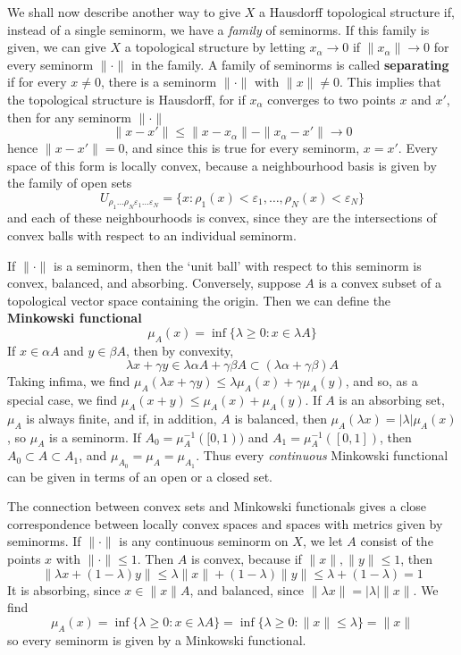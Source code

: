 We shall now describe another way to give $X$ a Hausdorff topological structure if, instead of a single seminorm, we have a {\it family} of seminorms. If this family is given, we can give $X$ a topological structure by letting $x_\alpha \to 0$ if $\| x_\alpha \| \to 0$ for every seminorm $\| \cdot \|$ in the family. A family of seminorms is called {\bf separating} if for every $x \neq 0$, there is a seminorm $\| \cdot \|$ with $\| x \| \neq 0$. This implies that the topological structure is Hausdorff, for if $x_\alpha$ converges to two points $x$ and $x'$, then for any seminorm $\| \cdot \|$
%
\[ \| x - x' \| \leq \| x - x_\alpha \| - \| x_\alpha - x' \| \to 0 \]
%
hence $\| x - x' \| = 0$, and since this is true for every seminorm, $x = x'$. Every space of this form is locally convex, because a neighbourhood basis is given by the family of open sets
%
\[ U_{\rho_1 \dots \rho_N \varepsilon_1 \dots \varepsilon_N} = \{ x: \rho_1(x) < \varepsilon_1, \dots, \rho_N(x) < \varepsilon_N \} \]
%
and each of these neighbourhoods is convex, since they are the intersections of convex balls with respect to an individual seminorm.

If $\| \cdot \|$ is a seminorm, then the `unit ball' with respect to this seminorm is convex, balanced, and absorbing. Conversely, suppose $A$ is a convex subset of a topological vector space containing the origin. Then we can define the {\bf Minkowski functional}
%
\[ \mu_A(x) = \inf \{ \lambda \geq 0: x \in \lambda A \} \]
%
If $x \in \alpha A$ and $y \in \beta A$, then by convexity,
%
\[ \lambda x + \gamma y \in \lambda \alpha A + \gamma \beta A \subset (\lambda \alpha + \gamma \beta) A \]
%
Taking infima, we find $\mu_A(\lambda x + \gamma y) \leq \lambda \mu_A(x) + \gamma \mu_A(y)$, and so, as a special case, we find $\mu_A(x + y) \leq \mu_A(x) + \mu_A(y)$. If $A$ is an absorbing set, $\mu_A$ is always finite, and if, in addition, $A$ is balanced, then $\mu_A(\lambda x) = |\lambda| \mu_A(x)$, so $\mu_A$ is a seminorm. If $A_0 = \mu_A^{-1}([0,1))$ and $A_1 = \mu_A^{-1}([0,1])$, then $A_0 \subset A \subset A_1$, and $\mu_{A_0} = \mu_A = \mu_{A_1}$. Thus every {\it continuous} Minkowski functional can be given in terms of an open or a closed set.

The connection between convex sets and Minkowski functionals gives a close correspondence between locally convex spaces and spaces with metrics given by seminorms. If $\| \cdot \|$ is any continuous seminorm on $X$, we let $A$ consist of the points $x$ with $\| \cdot \| \leq 1$. Then $A$ is convex, because if $\| x \|, \| y \| \leq 1$, then
%
\[ \| \lambda x + (1 - \lambda) y \| \leq \lambda \| x \| + (1 - \lambda) \| y \| \leq \lambda + (1 - \lambda) = 1 \]
%
It is absorbing, since $x \in \| x \| A$, and balanced, since $\| \lambda x \| = |\lambda| \| x \|$. We find
%
\[ \mu_A(x) = \inf \{ \lambda \geq 0: x \in \lambda A \} = \inf \{ \lambda \geq 0: \| x \| \leq \lambda \} = \| x \| \]
%
so every seminorm is given by a Minkowski functional.

